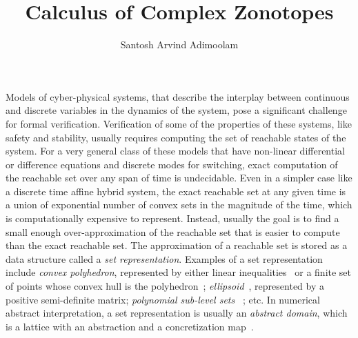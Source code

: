 \documentclass[11pt,a4paper,twoside,openright]{article}
\title{Calculus of Complex Zonotopes}
\author{Santosh Arvind Adimoolam}
\date{}
\begin{document}
\maketitle Models of cyber-physical systems, that describe the
interplay between continuous and discrete variables in the dynamics of
the system, pose a significant challenge for formal verification.
Verification of some of the properties of these systems, like safety
and stability, usually requires computing the set of reachable states
of the system.  For a very general class of these models that have
non-linear differential or difference equations and discrete modes for
switching, exact computation of the reachable set over any span of
time is undecidable.  Even in a simpler case like a discrete time
affine hybrid system, the exact reachable set at any given time is a
union of exponential number of convex sets in the magnitude of the
time, which is computationally expensive to represent.  Instead,
usually the goal is to find a small enough over-approximation of the
reachable set that is easier to compute than the exact reachable set.
The approximation of a reachable set is stored as a data structure
called a {\it set representation}.  Examples of a set representation
include {\it convex polyhedron}, represented by either linear
inequalities~\cite{cousot1978automatic,Sankaranarayanan+Dang+Ivancic-08-Symbolic}
or a finite set of points whose convex hull is the
polyhedron~\cite{kvasnica2004multi}; {\it
  ellipsoid}~\cite{DBLP:journals/tecs/AllamigeonGSGP16,kurzhanskiy2006ellipsoidal},
represented by a positive semi-definite matrix; {\it polynomial
  sub-level sets}~\cite{DBLP:conf/esop/AdjeGG10,prajna2004safety} ;
etc.  In numerical abstract interpretation, a set representation is
usually an {\it abstract domain}, which is a lattice with an
abstraction and a concretization map~\cite{jeannet2009apron}.
\end{document}
